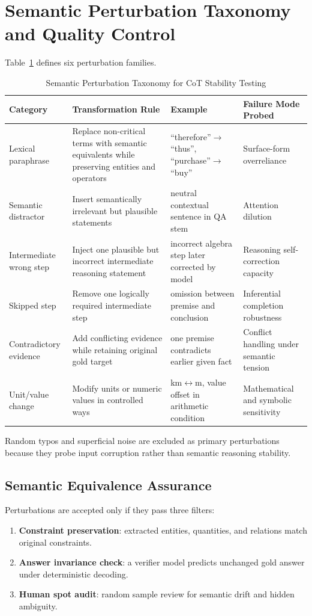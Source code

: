 \documentclass[conference]{IEEEtran}
\begin{document}
\section{Semantic Perturbation Taxonomy and Quality Control}
Table~\ref{tab:taxonomy} defines six perturbation families.

\begin{table}[!t]
\caption{Semantic Perturbation Taxonomy for CoT Stability Testing}
\label{tab:taxonomy}
\centering
\begin{tabular}{p{2.2cm}p{4.9cm}p{4.9cm}p{2.8cm}}
\toprule
Category & Transformation Rule & Example & Failure Mode Probed \\
\midrule
Lexical paraphrase & Replace non-critical terms with semantic equivalents while preserving entities and operators & ``therefore''$\rightarrow$``thus'', ``purchase''$\rightarrow$``buy'' & Surface-form overreliance \\
Semantic distractor & Insert semantically irrelevant but plausible statements & neutral contextual sentence in QA stem & Attention dilution \\
Intermediate wrong step & Inject one plausible but incorrect intermediate reasoning statement & incorrect algebra step later corrected by model & Reasoning self-correction capacity \\
Skipped step & Remove one logically required intermediate step & omission between premise and conclusion & Inferential completion robustness \\
Contradictory evidence & Add conflicting evidence while retaining original gold target & one premise contradicts earlier given fact & Conflict handling under semantic tension \\
Unit/value change & Modify units or numeric values in controlled ways & km$\leftrightarrow$m, value offset in arithmetic condition & Mathematical and symbolic sensitivity \\
\bottomrule
\end{tabular}
\end{table}

Random typos and superficial noise are excluded as primary perturbations because they probe input corruption rather than semantic reasoning stability.

\subsection{Semantic Equivalence Assurance}
Perturbations are accepted only if they pass three filters:
\begin{enumerate}[leftmargin=*]
\item \textbf{Constraint preservation}: extracted entities, quantities, and relations match original constraints.
\item \textbf{Answer invariance check}: a verifier model predicts unchanged gold answer under deterministic decoding.
\item \textbf{Human spot audit}: random sample review for semantic drift and hidden ambiguity.
\end{enumerate}
\end{document}
